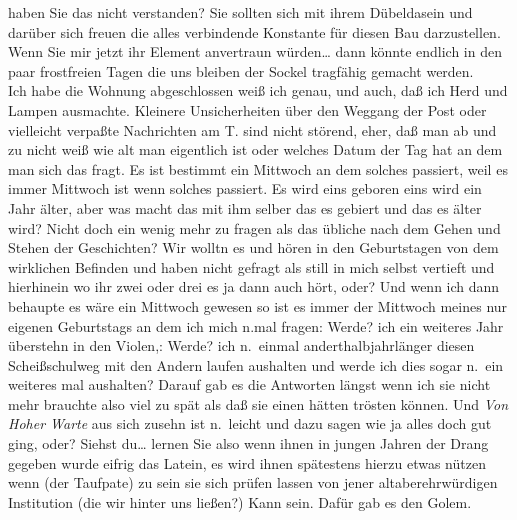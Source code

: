 \documentclass[
]{article}
\begin{document}
haben Sie das nicht verstanden? Sie sollten sich mit ihrem Dübeldasein
und darüber sich freuen die alles verbindende Konstante für diesen Bau
darzustellen. Wenn Sie mir jetzt ihr Element anvertraun würden\ldots{}
dann könnte endlich in den paar frostfreien Tagen die uns bleiben der
Sockel tragfähig gemacht werden.\\
Ich habe die Wohnung abgeschlossen weiß ich genau, und auch, daß ich
Herd und Lampen ausmachte. Kleinere Unsicherheiten über den Weggang der
Post oder vielleicht verpaßte Nachrichten am T. sind nicht störend,
eher, daß man ab und zu nicht weiß wie alt man eigentlich ist oder
welches Datum der Tag hat an dem man sich das fragt. Es ist bestimmt ein
Mittwoch an dem solches passiert, weil es immer Mittwoch ist wenn
solches passiert. Es wird eins geboren eins wird ein Jahr älter, aber
was macht das mit ihm selber das es gebiert und das es älter wird? Nicht
doch ein wenig mehr zu fragen als das übliche nach dem Gehen und Stehen
der Geschichten? Wir wolltn es und hören in den Geburtstagen von dem
wirklichen Befinden und haben nicht gefragt als still in mich selbst
vertieft und hierhinein wo ihr zwei oder drei es ja dann auch hört,
oder? Und wenn ich dann behaupte es wäre ein Mittwoch gewesen so ist es
immer der Mittwoch meines nur eigenen Geburtstags an dem ich mich n.mal
fragen: Werde? ich ein weiteres Jahr überstehn in den Violen,: Werde?
ich n.~einmal anderthalbjahrlänger diesen Scheißschulweg mit den Andern
laufen aushalten und werde ich dies sogar n.~ein weiteres mal aushalten?
Darauf gab es die Antworten längst wenn ich sie nicht mehr brauchte also
viel zu spät als daß sie einen hätten trösten können. Und \emph{Von
Hoher Warte }aus sich zusehn ist n.~leicht und dazu sagen wie ja alles
doch gut ging, oder? Siehst du\ldots{} lernen Sie also wenn ihnen in
jungen Jahren der Drang gegeben wurde eifrig das Latein, es wird ihnen
spätestens hierzu etwas nützen wenn (der Taufpate) zu sein sie sich
prüfen lassen von jener altaberehrwürdigen Institution (die wir hinter
uns ließen?) Kann sein. Dafür gab es den Golem.
\end{document}
